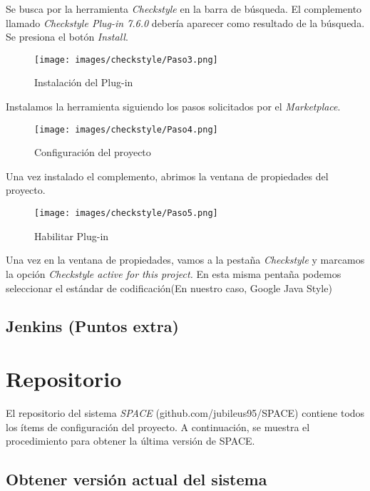 \documentclass{scrreprt}
\begin{document}
Se busca por la herramienta \textit{Checkstyle} en la barra de búsqueda. El complemento llamado \textit{Checkstyle Plug-in 7.6.0} debería aparecer como resultado de la búsqueda. Se presiona el botón \textit{Install}.

\begin{figure}[H]
	\centering
    \texttt{[image: images/checkstyle/Paso3.png]}
    \caption{Instalación del Plug-in}\label{}
\end{figure}

Instalamos la herramienta siguiendo los pasos solicitados por el \textit{Marketplace}.

\begin{figure}[H]
	\centering
    \texttt{[image: images/checkstyle/Paso4.png]}
    \caption{Configuración del proyecto}\label{}
\end{figure}

Una vez instalado el complemento, abrimos la ventana de propiedades del proyecto.

\begin{figure}[H]
	\centering
    \texttt{[image: images/checkstyle/Paso5.png]}
    \caption{Habilitar Plug-in}
\end{figure}

Una vez en la ventana de propiedades, vamos a la pestaña \textit{Checkstyle} y marcamos la opción \textit{Checkstyle active for this project.} En esta misma pentaña podemos seleccionar el estándar de codificación(En nuestro caso, Google Java Style)

\section{Jenkins (Puntos extra)}




\chapter{Repositorio}

El repositorio del sistema \textit{SPACE} (github.com/jubileus95/SPACE) contiene todos los ítems de configuración del proyecto. A continuación, se muestra el procedimiento para obtener la última versión de SPACE.

\section{Obtener versión actual del sistema}
\end{document}

